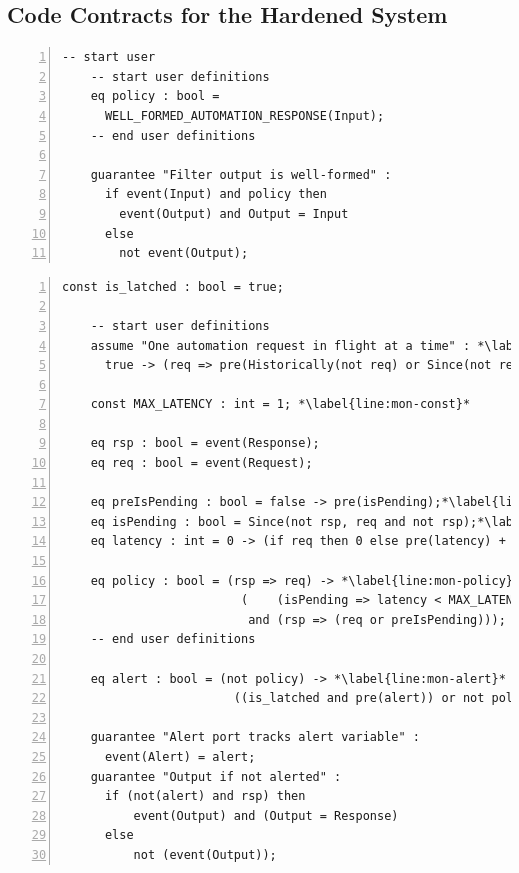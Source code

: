 \documentclass[global,twocolumn]{svjour}
\begin{document}
\subsection{Code Contracts for the Hardened System}
\label{sec:ha-contracts}

\newsavebox{\flt}
\begin{lrbox}{\flt}
  \begin{lstlisting}[style=agree,numbers=left] -- start user
    -- start user definitions
    eq policy : bool =
      WELL_FORMED_AUTOMATION_RESPONSE(Input);
    -- end user definitions

    guarantee "Filter output is well-formed" :
      if event(Input) and policy then
        event(Output) and Output = Input
      else
        not event(Output);
  \end{lstlisting}
\end{lrbox}

\newsavebox{\mntr}
\begin{lrbox}{\mntr}
  \begin{lstlisting}[style=agree,numbers=left]
    const is_latched : bool = true;

    -- start user definitions
    assume "One automation request in flight at a time" : *\label{line:mon-assume}*
      true -> (req => pre(Historically(not req) or Since(not req, rsp)));

    const MAX_LATENCY : int = 1; *\label{line:mon-const}*

    eq rsp : bool = event(Response);
    eq req : bool = event(Request);

    eq preIsPending : bool = false -> pre(isPending);*\label{line:mon-pre-pending}*
    eq isPending : bool = Since(not rsp, req and not rsp);*\label{line:mon-pending}*
    eq latency : int = 0 -> (if req then 0 else pre(latency) + 1);*\label{line:mon-latency}*

    eq policy : bool = (rsp => req) -> *\label{line:mon-policy}*
                         (    (isPending => latency < MAX_LATENCY)
                          and (rsp => (req or preIsPending)));
    -- end user definitions

    eq alert : bool = (not policy) -> *\label{line:mon-alert}*
                        ((is_latched and pre(alert)) or not policy);

    guarantee "Alert port tracks alert variable" :
      event(Alert) = alert;
    guarantee "Output if not alerted" :
      if (not(alert) and rsp) then
          event(Output) and (Output = Response)
      else
          not (event(Output));
  \end{lstlisting}
\end{lrbox}
\end{document}

